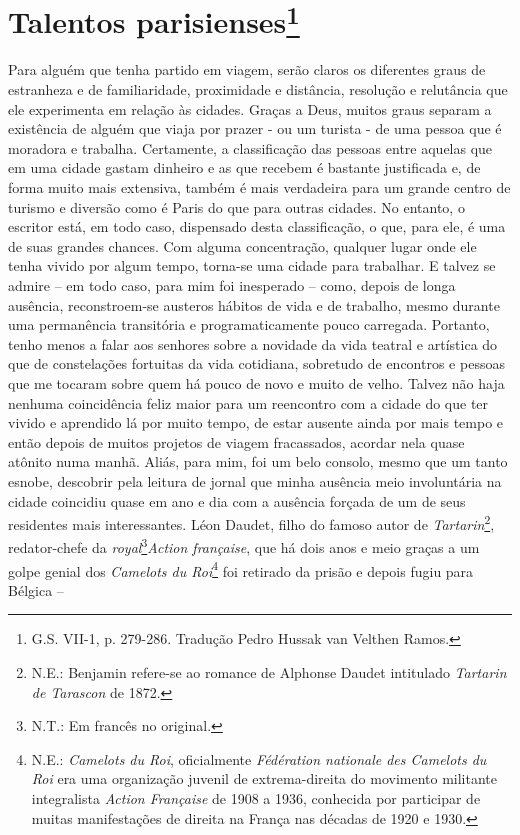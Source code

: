 \chapter{Talentos parisienses\footnote[*]{G.S. VII-1, p.
  279-286. Tradução Pedro Hussak van Velthen Ramos.}}

Para alguém que tenha partido em viagem, serão claros os diferentes
graus de estranheza e de familiaridade, proximidade e distância,
resolução e relutância que ele experimenta em relação às cidades. Graças
a Deus, muitos graus separam a existência de alguém que viaja por prazer
- ou um turista - de uma pessoa que é moradora e trabalha. Certamente, a
classificação das pessoas entre aquelas que em uma cidade gastam
dinheiro e as que recebem é bastante justificada e, de forma muito mais
extensiva, também é mais verdadeira para um grande centro de turismo e
diversão como é Paris do que para outras cidades. No entanto, o escritor
está, em todo caso, dispensado desta classificação, o que, para ele, é
uma de suas grandes chances. Com alguma concentração, qualquer lugar
onde ele tenha vivido por algum tempo, torna-se uma cidade para
trabalhar. E talvez se admire -- em todo caso, para mim foi inesperado
-- como, depois de longa ausência, reconstroem-se austeros hábitos de
vida e de trabalho, mesmo durante uma permanência transitória e
programaticamente pouco carregada. Portanto, tenho menos a falar aos
senhores sobre a novidade da vida teatral e artística do que de
constelações fortuitas da vida cotidiana, sobretudo de encontros e
pessoas que me tocaram sobre quem há pouco de novo e muito de velho.
Talvez não haja nenhuma coincidência feliz maior para um reencontro com
a cidade do que ter vivido e aprendido lá por muito tempo, de estar
ausente ainda por mais tempo e então depois de muitos projetos de viagem
fracassados, acordar nela quase atônito numa manhã. Aliás, para mim, foi
um belo consolo, mesmo que um tanto esnobe, descobrir pela leitura de
jornal que minha ausência meio involuntária na cidade coincidiu quase em
ano e dia com a ausência forçada de um de seus residentes mais
interessantes. Léon Daudet, filho do famoso autor de
\emph{Tartarin}\footnote{N.E.: Benjamin refere-se ao romance de Alphonse
  Daudet intitulado \emph{Tartarin de Tarascon} de 1872.}, redator-chefe
da \emph{royal}\footnote{N.T.: Em francês no original.}\emph{Action
française}, que há dois anos e meio graças a um golpe genial dos
\emph{Camelots du Roi}\footnote{N.E.: \emph{Camelots du Roi},
  oficialmente \emph{Fédération nationale des Camelots du Roi} era uma
  organização juvenil de extrema-direita do movimento militante
  integralista \emph{Action Française} de 1908 a 1936, conhecida por
  participar de muitas manifestações de direita na França nas décadas de
  1920 e 1930.} foi retirado da prisão e depois fugiu para Bélgica --
